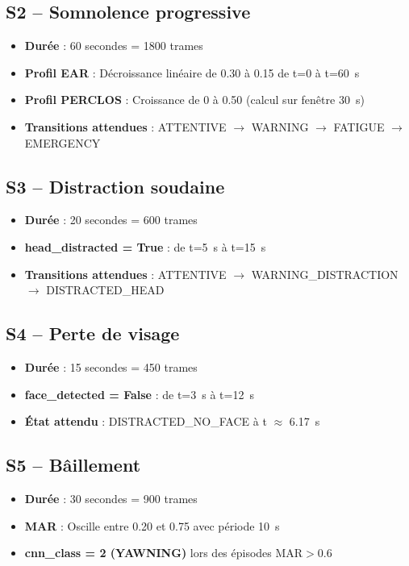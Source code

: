 \documentclass[12pt,a4paper]{report}
\begin{document}
\subsection{S2 -- Somnolence progressive}

\begin{itemize}
  \item \textbf{Dur\'ee} : 60 secondes = 1800 trames
  \item \textbf{Profil EAR} : D\'ecroissance lin\'eaire de 0.30 \`a 0.15 de t=0 \`a t=60~s
  \item \textbf{Profil PERCLOS} : Croissance de 0 \`a 0.50 (calcul sur fen\^etre 30~s)
  \item \textbf{Transitions attendues} : ATTENTIVE $\to$ WARNING $\to$ FATIGUE $\to$ EMERGENCY
\end{itemize}

\subsection{S3 -- Distraction soudaine}

\begin{itemize}
  \item \textbf{Dur\'ee} : 20 secondes = 600 trames
  \item \textbf{head\_distracted = True} : de t=5~s \`a t=15~s
  \item \textbf{Transitions attendues} : ATTENTIVE $\to$ WARNING\_DISTRACTION $\to$ DISTRACTED\_HEAD
\end{itemize}

\subsection{S4 -- Perte de visage}

\begin{itemize}
  \item \textbf{Dur\'ee} : 15 secondes = 450 trames
  \item \textbf{face\_detected = False} : de t=3~s \`a t=12~s
  \item \textbf{\'Etat attendu} : DISTRACTED\_NO\_FACE \`a t $\approx$ 6.17~s
\end{itemize}

\subsection{S5 -- B\^aillement}

\begin{itemize}
  \item \textbf{Dur\'ee} : 30 secondes = 900 trames
  \item \textbf{MAR} : Oscille entre 0.20 et 0.75 avec p\'eriode 10~s
  \item \textbf{cnn\_class = 2 (YAWNING)} lors des \'episodes MAR$>$0.6
\end{itemize}
\end{document}
